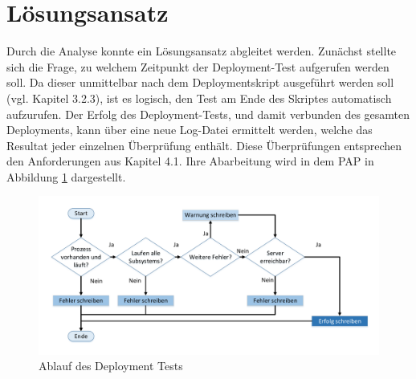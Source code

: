 \section{Lösungsansatz}
Durch die Analyse konnte ein Lösungsansatz abgleitet werden. Zunächst stellte sich die Frage, zu welchem Zeitpunkt der Deployment-Test aufgerufen werden soll. Da dieser unmittelbar nach dem Deploymentskript ausgeführt werden soll (vgl. Kapitel 3.2.3), ist es logisch, den Test am Ende des Skriptes automatisch aufzurufen. Der Erfolg des Deployment-Tests, und damit verbunden des gesamten Deployments, kann über eine neue Log-Datei ermittelt werden, welche das Resultat jeder einzelnen Überprüfung enthält. Diese Überprüfungen entsprechen den Anforderungen aus Kapitel 4.1. Ihre Abarbeitung wird in dem \acs{PAP} in Abbildung \ref{fig:Deploy_Test} dargestellt.
\begin{figure}[H]
\centering
\includegraphics[width=1\linewidth]{../images/Deploy_Test}
\vspace{-50pt}
\caption{Ablauf des Deployment Tests}
\vspace{-5pt}
\label{fig:Deploy_Test}
\end{figure}

